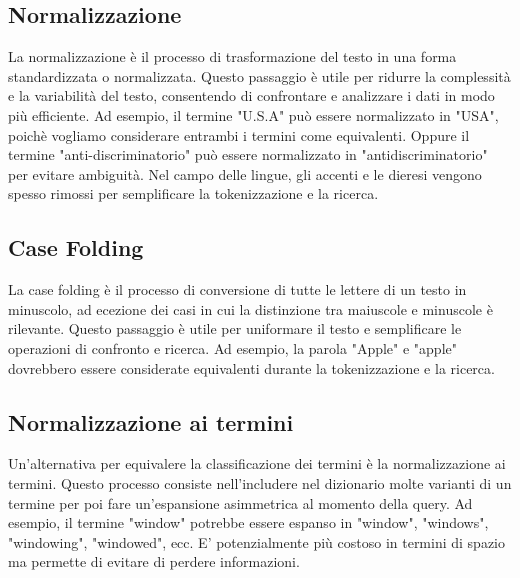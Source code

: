\documentclass{report}
\begin{document}
	\subsection{Normalizzazione}
	La normalizzazione è il processo di trasformazione del testo in una forma standardizzata o normalizzata. Questo passaggio è utile per ridurre la complessità e la variabilità del testo, consentendo di confrontare e analizzare i dati in modo più efficiente. Ad esempio, il termine "U.S.A" può essere normalizzato in "USA", poichè vogliamo considerare entrambi i termini come equivalenti. Oppure il termine "anti-discriminatorio" può essere normalizzato in "antidiscriminatorio" per evitare ambiguità. Nel campo delle lingue, gli accenti e le dieresi vengono spesso rimossi per semplificare la tokenizzazione e la ricerca.

	\subsection{Case Folding}
	La case folding è il processo di conversione di tutte le lettere di un testo in minuscolo, ad ecezione dei casi in cui la distinzione tra maiuscole e minuscole è rilevante. Questo passaggio è utile per uniformare il testo e semplificare le operazioni di confronto e ricerca. Ad esempio, la parola "Apple" e "apple" dovrebbero essere considerate equivalenti durante la tokenizzazione e la ricerca.

	\subsection{Normalizzazione ai termini}
	Un'alternativa per equivalere la classificazione dei termini è la normalizzazione ai termini. Questo processo consiste nell'includere nel dizionario molte varianti di un termine per poi fare un'espansione asimmetrica al momento della query. Ad esempio, il termine "window" potrebbe essere espanso in "window", "windows", "windowing", "windowed", ecc. E' potenzialmente più costoso in termini di spazio ma permette di evitare di perdere informazioni.
\end{document}
